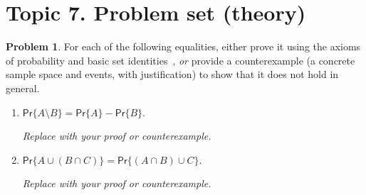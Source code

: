 \documentclass[dvipsnames]{article}
\begin{document}
\section*{Topic 7. Problem set (theory)}
\setcounter{section}{7}

\pagestyle{fancy}
\rhead{}

\theoremstyle{definition}
\newtheorem{problem}{Problem}[section]

\begin{problem}
  For each of the following equalities,
  either prove it using the axioms of probability and basic set identities~\cite[\S B.2--B.3]{CLRS-2022},
  \emph{or} provide a counterexample (a concrete sample space and events, with justification)
  to show that it does not hold in general.

  \begin{enumerate}
    \item \(\mathsf{Pr}\{A \setminus B\} = \mathsf{Pr}\{A\} - \mathsf{Pr}\{B\}\).

\color{purple}
\begin{mdframed}
  \color{purple}
  \emph{Replace with your proof or counterexample.}
\end{mdframed}

\color{black}\noindent
    \item \(\mathsf{Pr}\{A \cup (B \cap C)\} = \mathsf{Pr}\{(A \cap B) \cup C\}\).

\color{purple}
\begin{mdframed}
  \color{purple}
  \emph{Replace with your proof or counterexample.}
\end{mdframed}

  \end{enumerate}
\end{problem}
\end{document}
